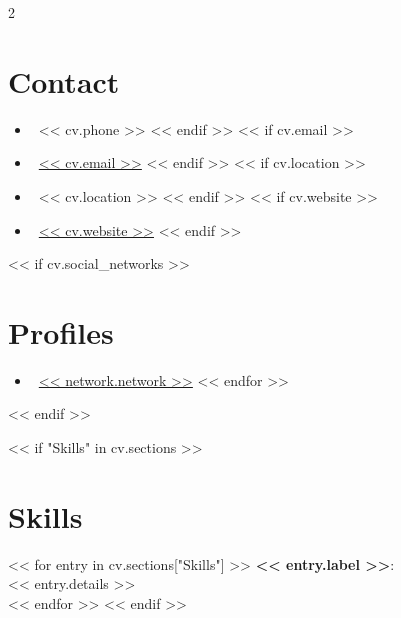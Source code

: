 \documentclass[10pt, letterpaper]{article}
\begin{document}
\begin{paracol}{2}

\begin{leftcolumn}
\colorbox{primaryColor}{
    \begin{minipage}{\linewidth}
    \color{darkGrey}
    \section*{Contact}
    \begin{itemize}[label={}, leftmargin=0pt]
        << if cv.phone >>
        \item \faPhone \ << cv.phone >>
        << endif >>
        << if cv.email >>
        \item \faEnvelope \ \href{mailto:<< cv.email >>}{<< cv.email >>}
        << endif >>
        << if cv.location >>
        \item \faMapMarker \ << cv.location >>
        << endif >>
        << if cv.website >>
        \item \faGlobe \ \href{<< cv.website >>}{<< cv.website >>}
        << endif >>
    \end{itemize}

    << if cv.social_networks >>
    \section*{Profiles}
    \begin{itemize}[label={}, leftmargin=0pt]
        << for network in cv.social_networks >>
        \item \faLink \ \href{<< network.url >>}{<< network.network >>}
        << endfor >>
    \end{itemize}
    << endif >>

    << if "Skills" in cv.sections >>
    \section*{Skills}
    << for entry in cv.sections["Skills"] >>
    \textbf{<< entry.label >>}: \\
    << entry.details >> \\
    << endfor >>
    << endif >>

    \vspace{2cm} %
    \end{minipage}
}
\end{leftcolumn}


\end{paracol}
\end{document}
